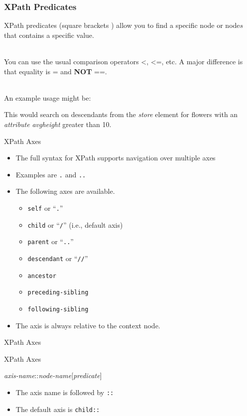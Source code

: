 \documentclass[svgnames]{beamer}
\begin{document}
\begin{frame}
\frametitle{XPath Predicates}
XPath predicates (square brackets \code{[]}) allow you to find a specific node or node\(s\) that contains a specific value.

~\\

You can use the usual comparison operators <, <=, etc.  A major difference is that equality is = and \textbf{NOT} ==.  

~\\

An example usage might be:

\begin{center}
\end{center}

This would search on descendants from the \emph{store} element for flowers with an \emph{attribute} \emph{avgheight} greater than 10.
\end{frame}

\begin{frame}[fragile]{XPath Axes}
\begin{itemize}
	\item The full syntax for XPath supports navigation over multiple \alert{axes}
	\item Examples are \texttt{.} and \texttt{..}
	\item The following axes are available.
	\begin{itemize}
		\item \texttt{self} or ``\texttt{.}''
		\item \texttt{child} or ``\texttt{/}'' (i.e., default axis)
		\item \texttt{parent} or ``\texttt{..}''
		\item \texttt{descendant} or ``\texttt{//}''
		\item \texttt{ancestor}
		\item \texttt{preceding-sibling}
		\item \texttt{following-sibling}
	\end{itemize}
	\item The axis is always relative to the context node.
\end{itemize}
\end{frame}

\begin{frame}[fragile]{XPath Axes}
\small
\begin{block}{XPath Axes}
\begin{semiverbatim}
\textit{axis-name}::\textit{node-name}[\textit{predicate}]
\end{semiverbatim}
\end{block}
\normalsize
\begin{itemize}
	\item The axis name is followed by \texttt{::}
	\item The default axis is \texttt{child::}
\end{itemize}
\end{frame}
\end{document}
